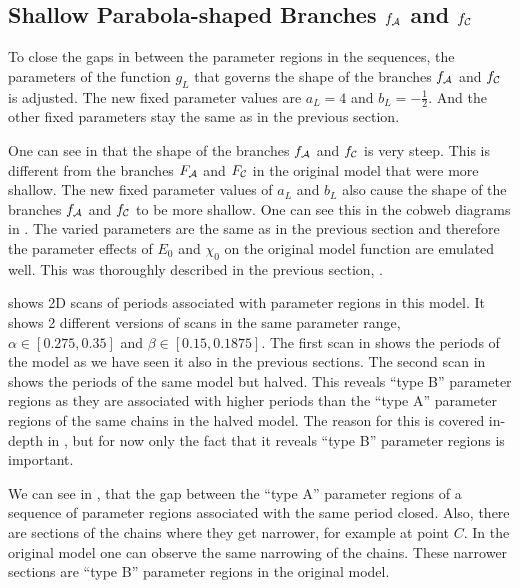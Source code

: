 \subsection{Shallow Parabola-shaped Branches $f_{\mathcal{A}}$ and $f_{\mathcal{C}}$}
\label{sec:setup.quad.hyper.2}

To close the gaps in between the parameter regions in the sequences, the parameters of the function $g_L$ that governs the shape of the branches $f_{\mathcal{A}}$ and $f_{\mathcal{C}}$ is adjusted.
The new fixed parameter values are $a_L = 4$ and $b_L = -\frac{1}{2}$.
And the other fixed parameters stay the same as in the previous section.

One can see in  that the shape of the branches $f_{\mathcal{A}}$ and $f_{\mathcal{C}}$ is very steep.
This is different from the branches $F_{\mathcal{A}}$ and $F_{\mathcal{C}}$ in the original model that were more shallow.
The new fixed parameter values of $a_L$ and $b_L$ also cause the shape of the branches $f_{\mathcal{A}}$ and $f_{\mathcal{C}}$ to be more shallow.
One can see this in the cobweb diagrams in .
The varied parameters are the same as in the previous section and therefore the parameter effects of $E_0$ and $\chi_0$ on the original model function are emulated well.
This was thoroughly described in the previous section, .

 shows 2D scans of periods associated with parameter regions in this model.
It shows 2 different versions of scans in the same parameter range, $\alpha \in [0.275, 0.35]$ and $\beta \in [0.15, 0.1875]$.
The first scan in  shows the periods of the model as we have seen it also in the previous sections.
The second scan in  shows the periods of the same model but halved.
This reveals ``type B'' parameter regions as they are associated with higher periods than the ``type A'' parameter regions of the same chains in the halved model.
The reason for this is covered in-depth in , but for now only the fact that it reveals ``type B'' parameter regions is important.

We can see in , that the gap between the ``type A'' parameter regions of a sequence of parameter regions associated with the same period closed.
Also, there are sections of the chains where they get narrower, for example at point $C$.
In the original model one can observe the same narrowing of the chains.
These narrower sections are ``type B'' parameter regions in the original model.


